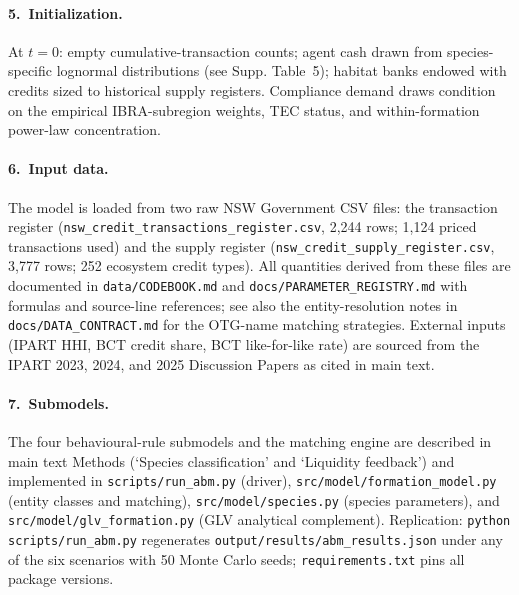 \documentclass[pdflatex,sn-nature,oneside]{sn-jnl}
\begin{document}
\paragraph{5.~Initialization.}
At $t = 0$: empty cumulative-transaction counts; agent cash drawn from
species-specific lognormal distributions (see Supp. Table~5); habitat
banks endowed with credits sized to historical supply registers.
Compliance demand draws condition on the empirical IBRA-subregion
weights, TEC status, and within-formation power-law concentration.

\paragraph{6.~Input data.}
The model is loaded from two raw NSW Government CSV files: the
transaction register (\texttt{nsw\_credit\_transactions\_register.csv},
2{,}244 rows; 1{,}124 priced transactions used) and the supply register
(\texttt{nsw\_credit\_supply\_register.csv}, 3{,}777 rows; 252 ecosystem
credit types). All quantities derived from these files are documented
in \texttt{data/CODEBOOK.md} and \texttt{docs/PARAMETER\_REGISTRY.md}
with formulas and source-line references; see also the entity-resolution
notes in \texttt{docs/DATA\_CONTRACT.md} for the OTG-name matching
strategies. External inputs (IPART HHI, BCT credit share, BCT
like-for-like rate) are sourced from the IPART 2023, 2024, and 2025
Discussion Papers as cited in main text.

\paragraph{7.~Submodels.}
The four behavioural-rule submodels and the matching engine are
described in main text Methods (`Species classification' and
`Liquidity feedback') and implemented in
\texttt{scripts/run\_abm.py} (driver), \texttt{src/model/formation\_model.py}
(entity classes and matching), \texttt{src/model/species.py} (species
parameters), and \texttt{src/model/glv\_formation.py} (GLV analytical
complement). Replication: \texttt{python scripts/run\_abm.py}
regenerates \texttt{output/results/abm\_results.json} under any of the
six scenarios with 50 Monte Carlo seeds; \texttt{requirements.txt} pins
all package versions.



\end{document}
